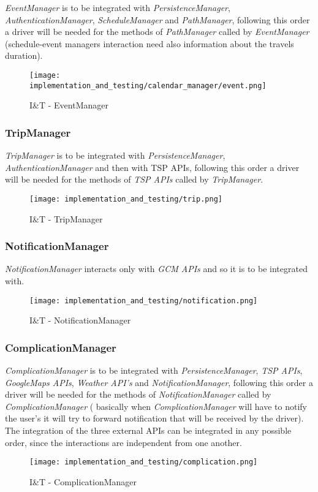 \noindent
\textit{EventManager} is to be integrated with \textit{PersistenceManager}, \textit{AuthenticationManager}, \textit{ScheduleManager} and \textit{PathManager}, following this order a driver will be needed for the methods of \textit{PathManager} called by \textit{EventManager} (schedule-event managers interaction need also information about the travels duration).
\begin{figure}[H]
	\begin{center}
		\texttt{[image: implementation\_and\_testing/calendar\_manager/event.png]}
	\end{center}
	\caption{I\&T - EventManager}
\end{figure}

\subsubsection{TripManager}
\textit{TripManager} is to be integrated with \textit{PersistenceManager}, \textit{AuthenticationManager} and then with TSP APIs, following this order a driver will be needed for the methods of \textit{TSP APIs} called by \textit{TripManager}.
\begin{figure}[H]
	\begin{center}
		\texttt{[image: implementation\_and\_testing/trip.png]}
	\end{center}
	\caption{I\&T - TripManager}
\end{figure}

\subsubsection{NotificationManager}
\textit{NotificationManager} interacts only with \textit{GCM APIs} and so it is to be integrated with.
\begin{figure}[H]
	\begin{center}
		\texttt{[image: implementation\_and\_testing/notification.png]}
	\end{center}
	\caption{I\&T - NotificationManager}
\end{figure}

\subsubsection{ComplicationManager}
\textit{ComplicationManager} is to be integrated with \textit{PersistenceManager}, \textit{TSP APIs}, \textit{GoogleMaps APIs}, \textit{Weather API's} and \textit{NotificationManager}, following this order a driver will be needed for the methods of \textit{NotificationManager} called by \textit{ComplicationManager} ( basically when \textit{ComplicationManager} will have to notify the user's it will try to forward notification that will be received by the driver).
The integration of the three external APIs can be integrated in any possible order, since the interactions are independent from one another.
\begin{figure}[H]
	\begin{center}
		\texttt{[image: implementation\_and\_testing/complication.png]}
	\end{center}
	\caption{I\&T - ComplicationManager}
\end{figure}

